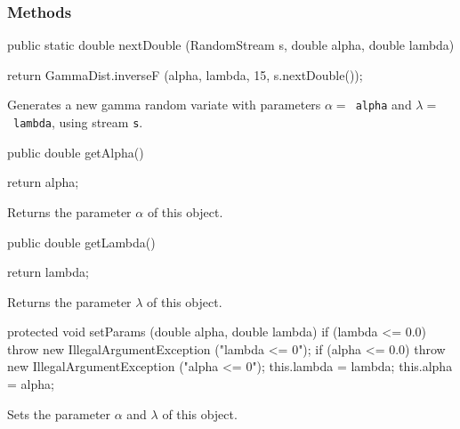 \subsubsection* {Methods}
\begin{code}

   public static double nextDouble (RandomStream s, 
                                    double alpha, double lambda)\begin{hide} {
      return GammaDist.inverseF (alpha, lambda, 15, s.nextDouble());
   }\end{hide}
\end{code}
\begin{tabb}  Generates a new gamma random variate 
  with parameters $\alpha = $~\texttt{alpha} and $\lambda = $~\texttt{lambda}, 
  using stream \texttt{s}.
\end{tabb}
\begin{code}

   public double getAlpha()\begin{hide} {
      return alpha;
   }\end{hide}
\end{code}
\begin{tabb} Returns the parameter $\alpha$ of this object.
\end{tabb}
\begin{code}

   public double getLambda()\begin{hide} {
      return lambda;
   }\end{hide}
\end{code}
\begin{tabb} Returns the parameter $\lambda$ of this object.
\end{tabb}
\begin{hide}\begin{code}

   protected void setParams (double alpha, double lambda) {
      if (lambda <= 0.0)
         throw new IllegalArgumentException ("lambda <= 0");
      if (alpha <= 0.0)
         throw new IllegalArgumentException ("alpha <= 0");
      this.lambda = lambda;
      this.alpha = alpha;
   }
\end{code}
\begin{tabb} Sets the parameter $\alpha$ and $\lambda$ of this object.
\end{tabb}
\begin{code}
}
\end{code}
\end{hide}
